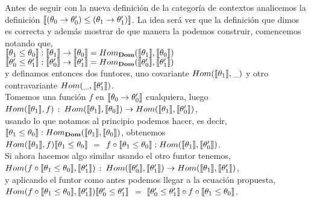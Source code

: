 Antes de seguir con la nueva definici\'on de la categor\'ia de contextos analicemos 
la definici\'on $\llbracket (\theta_0 \rightarrow \theta'_0) \leq (\theta_1 \rightarrow \theta'_1) \rrbracket$.
La idea ser\'a ver que la definici\'on que dimos es correcta y adem\'as mostrar de que manera
la podemos construir, comencemos notando que,\\

$\llbracket \theta_1 \leq \theta_0 \rrbracket : \llbracket \theta_1 \rrbracket \rightarrow \llbracket \theta_0 \rrbracket 
= Hom_{\textbf{Dom}}(\llbracket \theta_1 \rrbracket,\llbracket \theta_0 \rrbracket)$\\

$\llbracket \theta_0' \leq \theta_1' \rrbracket : \llbracket \theta_0' \rrbracket \rightarrow \llbracket \theta_1' \rrbracket
= Hom_{\textbf{Dom}}(\llbracket \theta_0' \rrbracket,\llbracket \theta_1' \rrbracket)$\\

y definamos entonces dos funtores, uno covariante $Hom(\llbracket \theta_1 \rrbracket, \_ )$ y otro contravariante
$Hom(\_,\llbracket \theta_1' \rrbracket)$. \\

Tomemos una funci\'on $f$ en $\llbracket \theta_0 \rightarrow \theta_0' \rrbracket$ cualquiera, luego \\

$Hom(\llbracket \theta_1 \rrbracket, f)$ $:$ 
$Hom(\llbracket \theta_1 \rrbracket, \llbracket \theta_0 \rrbracket) \rightarrow Hom(\llbracket \theta_1 \rrbracket, \llbracket \theta_0' \rrbracket)$,\\

usando lo que notamos al principio podemos hacer, es decir, $\llbracket \theta_1 \leq \theta_0 \rrbracket : Hom_{\textbf{Dom}}(\llbracket \theta_1 \rrbracket,\llbracket \theta_0 \rrbracket)$, obtenemos \\

$Hom(\llbracket \theta_1 \rrbracket, f) \llbracket \theta_1 \leq \theta_0 \rrbracket$ $=$ $f \circ \llbracket \theta_1 \leq \theta_0 \rrbracket : 
Hom(\llbracket \theta_1 \rrbracket, \llbracket \theta_0' \rrbracket)$.\\

Si ahora hacemos algo similar usando el otro funtor tenemos,\\

$Hom(f \circ \llbracket \theta_1 \leq \theta_0 \rrbracket, \llbracket \theta_1' \rrbracket)$ $:$ 
$Hom(\llbracket \theta_0' \rrbracket, \llbracket \theta_1' \rrbracket) \rightarrow Hom(\llbracket \theta_1 \rrbracket, \llbracket \theta_1' \rrbracket)$,\\

y aplicando el funtor como antes podemos llegar a la ecuación propuesta,\\

$Hom(f \circ \llbracket \theta_1 \leq \theta_0 \rrbracket, \llbracket \theta_1' \rrbracket)\llbracket \theta_0' \leq \theta_1' \rrbracket$ $=$
$\llbracket \theta_0' \leq \theta_1' \rrbracket \circ f \circ \llbracket \theta_1 \leq \theta_0 \rrbracket$.\\

